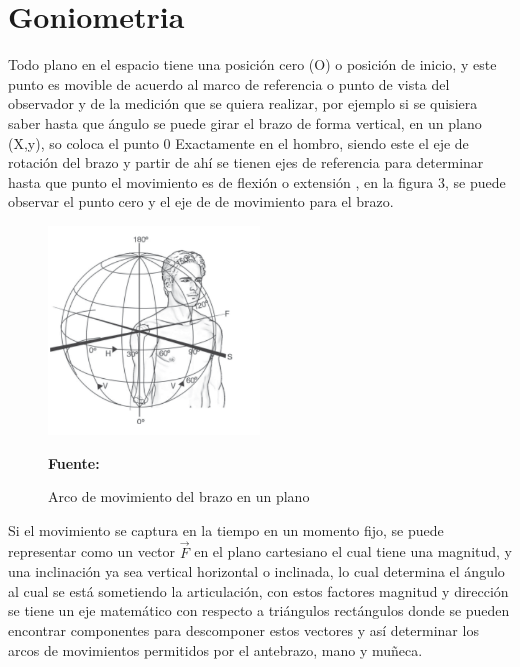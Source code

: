 \section{Goniometria}
Todo plano en el espacio tiene una posición cero (O) o posición de inicio, y este punto es movible de acuerdo al marco de referencia o punto de vista del observador y de la medición que se quiera realizar, por ejemplo si se quisiera saber hasta que ángulo se puede girar el brazo de forma vertical, en un plano (X,y),  so coloca el punto 0 Exactamente en el hombro, siendo este el eje de rotación del brazo y partir de ahí se tienen ejes de referencia para determinar hasta que punto el movimiento es de flexión o extensión , en la figura 3, se puede observar el punto cero y el eje de de movimiento para el brazo.

\begin{figure}[H]
    \centering
    \includegraphics[width=0.5\textwidth]{Anexos/LATEX/chapters/images/ejemplo1.PNG}
    \caption{Arco de movimiento del brazo en un plano}
    \small{\textbf{Fuente:}  }
    \label{GONIOMETRIA}
\end{figure}

Si el movimiento se captura en la tiempo en un momento fijo, se puede representar como un vector $\vec{F}$ en el plano cartesiano el cual tiene una magnitud, y una inclinación ya sea vertical horizontal o inclinada, lo cual determina el ángulo al cual se está sometiendo la articulación, con estos factores magnitud y dirección se tiene un eje matemático con respecto a triángulos rectángulos donde se pueden encontrar componentes para descomponer estos vectores y así determinar los arcos de movimientos permitidos por el antebrazo, mano y muñeca.




